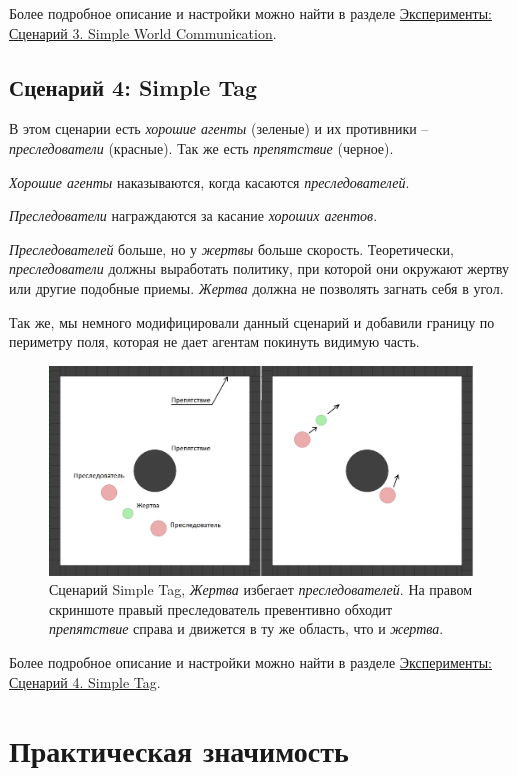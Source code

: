 Более подробное описание и настройки можно найти в разделе \hyperref[exp-swc]{Эксперименты: Сценарий 3. Simple World Communication}.

\subsection{Сценарий 4: Simple Tag} \label{intro-st}

В этом сценарии есть \textit{хорошие агенты} (зеленые) и их противники – \textit{преследователи} (красные). Так же есть \textit{препятствие} (черное).

\textit{Хорошие агенты} наказываются, когда касаются \textit{преследователей}.

\textit{Преследователи} награждаются за касание \textit{хороших агентов}.

\textit{Преследователей} больше, но у \textit{жертвы} больше скорость. Теоретически, \textit{преследователи} должны выработать политику, при которой они окружают жертву или другие подобные приемы. \textit{Жертва} должна не позволять загнать себя в угол.

Так же, мы немного модифицировали данный сценарий и добавили границу по периметру поля, которая не дает агентам покинуть видимую часть.

\begin{figure}[ht!] 
	\center
	\includegraphics [scale=0.41] {my_folder/images/st.png}
	\caption{Сценарий Simple Tag, \textit{Жертва} избегает \textit{преследователей}. На правом скриншоте правый преследователь превентивно обходит \textit{препятствие} справа и движется в ту же область, что и \textit{жертва}.}
	\label{fig:st}  
\end{figure}

Более подробное описание и настройки можно найти в разделе \hyperref[exp-st]{Эксперименты: Сценарий 4. Simple Tag}.

\section{Практическая значимость} \label{intro:sec3}

